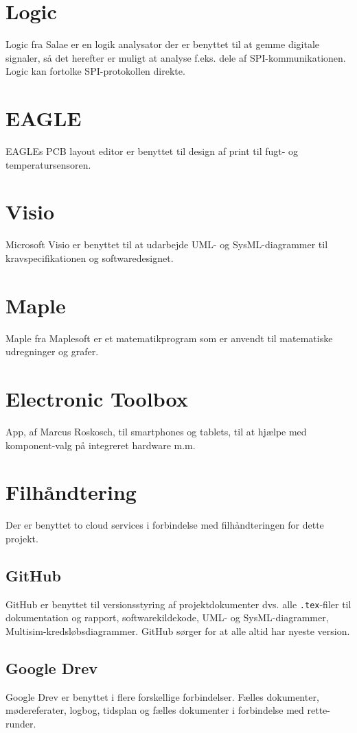 \section{Logic}
Logic fra Salae er en logik analysator der er benyttet til at gemme digitale signaler, så det herefter er muligt at analyse f.eks. dele af SPI-kommunikationen. Logic kan fortolke SPI-protokollen direkte.

\section{EAGLE}
EAGLEs PCB layout editor er benyttet til design af print til fugt- og temperatursensoren.

\section{Visio}
Microsoft Visio er benyttet til at udarbejde UML- og SysML-diagrammer til kravspecifikationen og softwaredesignet.

\section{Maple}
Maple fra Maplesoft er et matematikprogram som er anvendt til matematiske udregninger og grafer.

\section{Electronic Toolbox}
App, af Marcus Roskosch, til smartphones og tablets, til at hjælpe med komponent-valg på integreret hardware m.m.

\section{Filhåndtering}
Der er benyttet to cloud services i forbindelse med filhåndteringen for dette projekt.

\subsection{GitHub}
GitHub er benyttet til versionsstyring af projektdokumenter dvs. alle \verb+.tex+-filer til dokumentation og rapport, softwarekildekode, UML- og SysML-diagrammer, Multisim-kredsløbsdiagrammer. GitHub sørger for at alle altid har nyeste version. 

\subsection{Google Drev}
Google Drev er benyttet i flere forskellige forbindelser. Fælles dokumenter, mødereferater, logbog, tidsplan og fælles dokumenter i forbindelse med rette-runder.